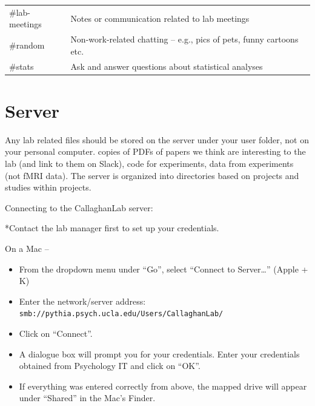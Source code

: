 \documentclass[]{book}
\providecommand{\tightlist}{%
  \setlength{\itemsep}{0pt}\setlength{\parskip}{0pt}}
\begin{document}
\begin{longtable}[]{@{}ll@{}}
\begin{minipage}[t]{0.10\columnwidth}
\#lab-meetings\strut
\end{minipage} & \begin{minipage}[t]{0.84\columnwidth}\raggedright
Notes or communication related to lab meetings\strut
\end{minipage}\tabularnewline
\begin{minipage}[t]{0.10\columnwidth}\raggedright
\#random\strut
\end{minipage} & \begin{minipage}[t]{0.84\columnwidth}\raggedright
Non-work-related chatting -- e.g., pics of pets, funny cartoons etc.\strut
\end{minipage}\tabularnewline
\begin{minipage}[t]{0.10\columnwidth}\raggedright
\#stats\strut
\end{minipage} & \begin{minipage}[t]{0.84\columnwidth}\raggedright
Ask and answer questions about statistical analyses\strut
\end{minipage}\tabularnewline
\bottomrule
\end{longtable}

\hypertarget{server}{%
\section{Server}\label{server}}

Any lab related files should be stored on the server under your user folder, not on your personal computer. copies of PDFs of papers we think are interesting to the lab (and link to them on Slack), code for experiments, data from experiments (not fMRI data). The server is organized into directories based on projects and studies within projects.

Connecting to the CallaghanLab server:

*Contact the lab manager first to set up your credentials.

On a Mac --

\begin{itemize}
\tightlist
\item
  From the dropdown menu under ``Go'', select ``Connect to Server\ldots{}'' (Apple + K)
\item
  Enter the network/server address: \texttt{smb://pythia.psych.ucla.edu/Users/CallaghanLab/}
\item
  Click on ``Connect''.
\item
  A dialogue box will prompt you for your credentials. Enter your credentials obtained from Psychology IT and click on ``OK''.
\item
  If everything was entered correctly from above, the mapped drive will appear under ``Shared'' in the Mac's Finder.
\end{itemize}
\end{document}
